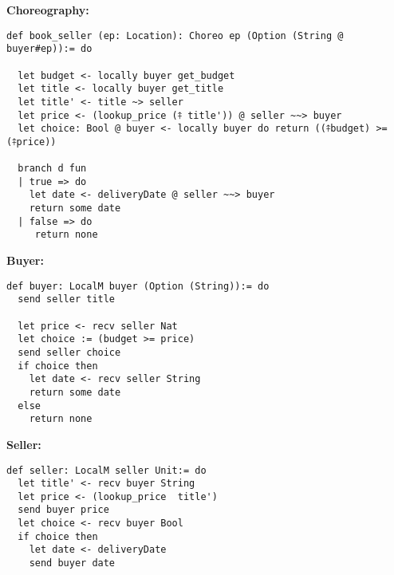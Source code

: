 \textbf{Choreography:}
\begin{lstlisting}[label={lst:buyer-seller-chor}, caption={Choreography}, language=lean, basicstyle=\tiny]
def book_seller (ep: Location): Choreo ep (Option (String @ buyer#ep)):= do

  let budget <- locally buyer get_budget
  let title <- locally buyer get_title
  let title' <- title ~> seller
  let price <- (lookup_price (⤉ title')) @ seller ~~> buyer
  let choice: Bool @ buyer <- locally buyer do return ((⤉budget) >= (⤉price))

  branch d fun
  | true => do
    let date <- deliveryDate @ seller ~~> buyer
    return some date
  | false => do
     return none
\end{lstlisting}
\noindent
\begin{minipage}{.5\textwidth}
\textbf{Buyer:}

\begin{lstlisting}[label={lst:buyer-ep}, caption={Buyer}, language=lean, basicstyle=\tiny]
def buyer: LocalM buyer (Option (String)):= do
  send seller title

  let price <- recv seller Nat
  let choice := (budget >= price)
  send seller choice
  if choice then
    let date <- recv seller String
    return some date
  else
    return none
\end{lstlisting}
\end{minipage}
\begin{minipage}{.5\textwidth}
\textbf{Seller:}
\begin{lstlisting}[label={lst:seller-ep}, caption={Buyer},language=lean, basicstyle=\small]
def seller: LocalM seller Unit:= do
  let title' <- recv buyer String
  let price <- (lookup_price  title')
  send buyer price
  let choice <- recv buyer Bool
  if choice then
    let date <- deliveryDate
    send buyer date
\end{lstlisting}
\end{minipage}
